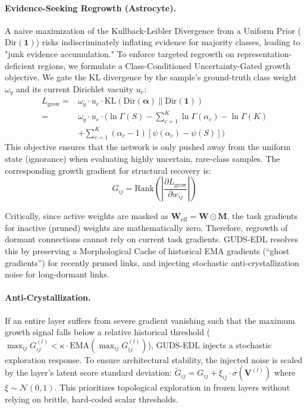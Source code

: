 \documentclass[letterpaper]{article} %
\newcommand{\Dir}{\text{Dir}}
\newcommand{\KL}{\text{KL}}
\begin{document}
\paragraph{Evidence-Seeking Regrowth (Astrocyte).}
A naive maximization of the Kullback-Leibler Divergence from a Uniform Prior ($\Dir(\mathbf{1})$) risks indiscriminately inflating evidence for majority classes, leading to "junk evidence accumulation." To enforce targeted regrowth on representation-deficient regions, we formulate a Class-Conditioned Uncertainty-Gated growth objective. We gate the KL divergence by the sample's ground-truth class weight $\omega_y$ and its current Dirichlet vacuity $u_e$:
\begin{equation}
\begin{split}
    L_{\text{grow}} ={}& \omega_y \cdot u_e \cdot \KL(\Dir(\bm{\alpha}) \parallel \Dir(\mathbf{1})) \\
    ={}& \omega_y \cdot u_e \cdot \Bigg( \ln \Gamma(S) - \sum_{c=1}^K \ln \Gamma(\alpha_c) - \ln \Gamma(K) \\
    &+ \sum_{c=1}^K (\alpha_c - 1)\left[ \psi(\alpha_c) - \psi(S) \right] \Bigg)
\end{split}
\end{equation}
This objective ensures that the network is only pushed away from the uniform state (ignorance) when evaluating highly uncertain, rare-class samples. The corresponding growth gradient for structural recovery is:
\begin{equation}\label{eq:G_ij}
    G_{ij} = \text{Rank}\left( \left| \frac{\partial L_{\text{grow}}}{\partial w_{ij}} \right| \right)
\end{equation}

Critically, since active weights are masked as $\bm{W}_{\text{eff}} = \bm{W} \odot \bm{M}$, the task gradients for inactive (pruned) weights are mathematically zero. Therefore, regrowth of dormant connections cannot rely on current task gradients. GUDS-EDL resolves this by preserving a Morphological Cache of historical EMA gradients (``ghost gradients'') for recently pruned links, and injecting stochastic anti-crystallization noise for long-dormant links.

\paragraph{Anti-Crystallization.} If an entire layer suffers from severe gradient vanishing such that the maximum growth signal falls below a relative historical threshold ($\max_{ij} G_{ij}^{(l)} < \kappa \cdot \text{EMA}(\max_{ij} G_{ij}^{(l)})$), GUDS-EDL injects a stochastic exploration response. To ensure architectural stability, the injected noise is scaled by the layer's latent score standard deviation: $\tilde{G}_{ij} = G_{ij} + \xi_{ij} \cdot \sigma(\bm{V}^{(l)})$ where $\xi \sim \mathcal{N}(0, 1)$. This prioritizes topological exploration in frozen layers without relying on brittle, hard-coded scalar thresholds.
\end{document}
